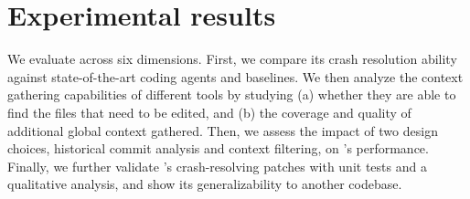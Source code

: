 \section{Experimental results}%
\label{sec:evaluation}
We evaluate \cresearcher{} across six dimensions.
First, we compare its crash resolution ability against state-of-the-art coding agents and baselines.
We then analyze the context gathering capabilities of different tools by studying (a) whether they are able to find the files that need to be edited, and (b) the coverage and quality of additional global context gathered.
Then, we assess the impact of two design choices, historical commit analysis and context filtering, on \cresearcher{}'s performance.
Finally, we further validate \cresearcher{}’s crash-resolving patches with unit tests and a qualitative analysis, and show its generalizability to another codebase.

